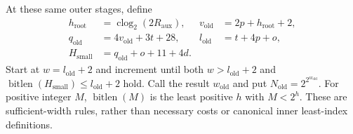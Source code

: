 \documentclass[11pt]{article}
\theoremstyle{plain}
\theoremstyle{definition}
\theoremstyle{remark}
\begin{document}
At these same outer stages, define
\begin{align*}
 h_{\mathrm{root}}&=\operatorname{clog}_2(2R_{\mathrm{aux}}),&
 v_{\mathrm{old}}&=2p+h_{\mathrm{root}}+2,\\
 q_{\mathrm{old}}&=4v_{\mathrm{old}}+3t+28,&
 l_{\mathrm{old}}&=t+4p+o,\\
 H_{\mathrm{small}}&=q_{\mathrm{old}}+o+11+4d.
\end{align*}
Start at $w=l_{\mathrm{old}}+2$ and increment until both
$w>l_{\mathrm{old}}+2$ and
$\operatorname{bitlen}(H_{\mathrm{small}})\le l_{\mathrm{old}}+2$ hold.
Call the result $w_{\mathrm{old}}$ and put
$N_{\mathrm{old}}=2^{2^{w_{\mathrm{old}}}}$.
For positive integer $M$, $\operatorname{bitlen}(M)$ is the least positive
$h$ with $M<2^h$. These are sufficient-width rules, rather than necessary
costs or canonical inner least-index definitions.

\end{document}

